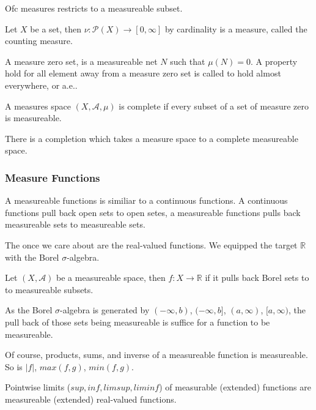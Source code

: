 \documentclass[main.tex]{subfiles}
\begin{document}
Ofc measures restricts to a measureable subset. 

\begin{example}
Let $X$ be a set, then $\nu: \mathcal{P}(X) \rightarrow [0, \infty]$ by cardinality is a measure, called the counting measure. 
\end{example}

A measure zero set, is a measureable net $N$ such that $\mu(N) = 0$. A property hold for all element away from a measure zero set is called to hold almost everywhere, or a.e..

\begin{definition}
A measures space $(X, \mathcal{A}, \mu)$ is complete if every subset of a set of measure zero is measureable.
\end{definition}

There is a completion which takes a measure space to a complete measureable space.

\subsubsection{Measure Functions}
A measureable functions is similiar to a continuous functions. A continuous functions pull back open sets to open setes, a measureable functions pulls back measureable sets to measureable sets.


The once we care about are the real-valued functions. We equipped the target $\mathbb{R}$ with the Borel $\sigma$-algebra. 

\begin{definition}
Let $(X, \mathcal{A})$ be a measureable space, then $f : X \rightarrow \mathbb{R}$ if it pulls back Borel sets to to measureable subsets.
\end{definition}

As the Borel $\sigma$-algebra is generated by $(-\infty, b)$, $(-\infty, b]$, $(a, \infty)$, $[a, \infty)$, the pull back of those sets being measureable is suffice for a function to be measureable.

Of course, products, sums, and inverse of a measureable function is measureable. So is $|f|$, $max(f,g)$, $min(f, g)$.




\begin{lemma}

Pointwise limits ($sup, inf, lim sup, lim inf$) of measurable (extended) functions are measureable (extended) real-valued functions. 
\end{lemma}
\end{document}
